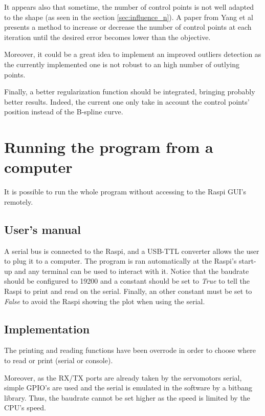 \documentclass{article}
\newcommand{\vsp}{\vspace{\baselineskip}}
\begin{document}
\vsp

It appears also that sometime, the number of control points is not well adapted to the shape (as seen in the section \ref{sec:influence_n}). A paper from Yang et al \cite{adjustement_ctrl_points} presents a method to increase or decrease the number of control points at each iteration until the desired error becomes lower than the objective.

\vsp

Moreover, it could be a great idea to implement an improved outliers detection as the currently implemented one is not robust to an high number of outlying points.

\vsp

Finally, a better regularization function should be integrated, bringing probably better results. Indeed, the current one only take in account the control points' position instead of the B-spline curve. 


\section{Running the program from a computer}

It is possible to run the whole program without accessing to the Raspi GUI's remotely.

\subsection{User's manual}

A serial bus is connected to the Raspi, and a USB-TTL converter allows the user to plug it to a computer. The program is ran automatically at the Raspi's start-up and any terminal can be used to interact with it. Notice that the baudrate should be configured to 19200 and a constant should be set to \textit{True} to tell the Raspi to print and read on the serial. Finally, an other constant must be set to \textit{False} to avoid the Raspi showing the plot when using the serial.  

\subsection{Implementation}

The printing and reading functions have been overrode in order to choose where to read or print (serial or console). 

\vsp

Moreover, as the RX/TX ports are already taken by the servomotors serial, simple GPIO's are used and the serial is emulated in the software by a bitbang library. Thus, the baudrate cannot be set higher as the speed is limited by the CPU's speed.  

\newpage
\listoffigures
\listoftables


\newpage


\end{document}
